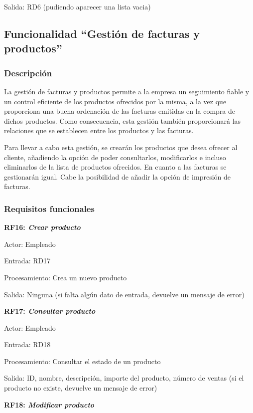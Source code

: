 \documentclass[paper=a4, fontsize=11pt, spanish]{scrartcl}
\begin{document}
Salida: RD6 (pudiendo aparecer una lista vacia)

\subsection{Funcionalidad “Gestión de facturas y productos”}
	
\subsubsection{Descripción}
\setlength{\parindent}{3em} La gestión de facturas y productos permite a la empresa un seguimiento fiable y un control eficiente de los productos ofrecidos por la misma, a la vez que proporciona una buena ordenación de las facturas emitidas en la compra de dichos productos. Como consecuencia, esta gestión también proporcionará las relaciones que se establecen entre los productos y las facturas.

	Para llevar a cabo esta gestión, se crearán los productos que desea ofrecer al cliente, añadiendo la opción de poder consultarlos, modificarlos e incluso eliminarlos de la lista de productos ofrecidos. En cuanto a las facturas se gestionarán igual. Cabe la posibilidad de añadir la opción de impresión de facturas.
	
\subsubsection{Requisitos funcionales}
\setlength{\parindent}{0em}
	\textbf{RF16: \textit{Crear producto}}
	\setlength{\parindent}{2em}
	
	Actor: Empleado
	
	Entrada: RD17
	
	Procesamiento: Crea un nuevo producto
	
	Salida: Ninguna (si falta algún dato de entrada, devuelve un mensaje de error)
	
	\setlength{\parindent}{0em}
	\textbf{RF17: \textit{Consultar producto}}
	\setlength{\parindent}{2em}
	
	Actor: Empleado
	
	Entrada: RD18
	
	Procesamiento: Consultar el estado de un producto
	
	Salida: ID, nombre, descripción, importe del producto, número de ventas (si el producto no existe, devuelve un mensaje de error)
	
	\setlength{\parindent}{0em}
	\textbf{RF18: \textit{Modificar producto}}
	\setlength{\parindent}{2em}
	
\end{document}

